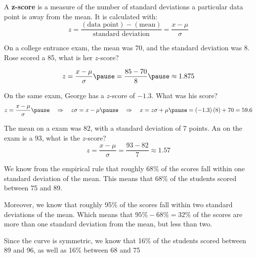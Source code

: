 \documentclass{beamer}
\begin{document}
\begin{frame}
\begin{definition}
A \textbf{z-score} is a measure of the number of standard deviations a particular data point is away from the mean. It is calculated with:
\begin{equation*}
z=\dfrac{\left(\text{data point}\right)-\left(\text{mean}\right)}{\text{standard deviation}}=\dfrac{x-\mu}{\sigma}
\end{equation*}
\end{definition}\pause

\begin{example}
On a college entrance exam, the mean was 70, and the standard deviation was 8. Rose scored a 85, what is her $z$-score?\pause

\begin{equation*}
z=\dfrac{x-\mu}{\sigma}\pause=\dfrac{85-70}{8}\pause\approx 1.875
\end{equation*}

\vspace{-4.3mm}
\end{example}\pause

\begin{example}
On the same exam, George has a $z$-score of $-1.3$. What was his score?\pause
\begin{equation*}
z=\dfrac{x-\mu}{\sigma}\pause
\quad\Rightarrow\quad
z\sigma=x-\mu\pause
\quad\Rightarrow\quad
x=z\sigma+\mu\pause = \left(-1.3\right)\left(8\right)+70=59.6
\end{equation*}

\vspace{-4.5mm}
\end{example}
\end{frame}

\begin{frame}
\begin{example}
The mean on a exam was 82, with a standard deviation of 7 points. An  on the exam is a 93, what is the $z$-score?\pause
\begin{equation*}
z=\dfrac{x-\mu}{\sigma}=\dfrac{93-82}{7}\approx 1.57
\end{equation*}
\end{example}\pause

\begin{note}
We know from the empirical rule that roughly 68\% of the scores fall within one standard deviation of the mean. This means that 68\% of the students scored between 75 and 89.\pause

\vspace{2mm}
Moreover, we know that roughly 95\% of the scores fall within two standard deviations of the mean. Which means that $95\%-68\%=32\%$ of the scores are more than one standard deviation from the mean, but less than two. \pause

\vspace{2mm}
Since the curve is symmetric, we know that 16\% of the students scored between 89 and 96, as well as 16\% between 68 and 75
\end{note}
\end{frame}
\end{document}
